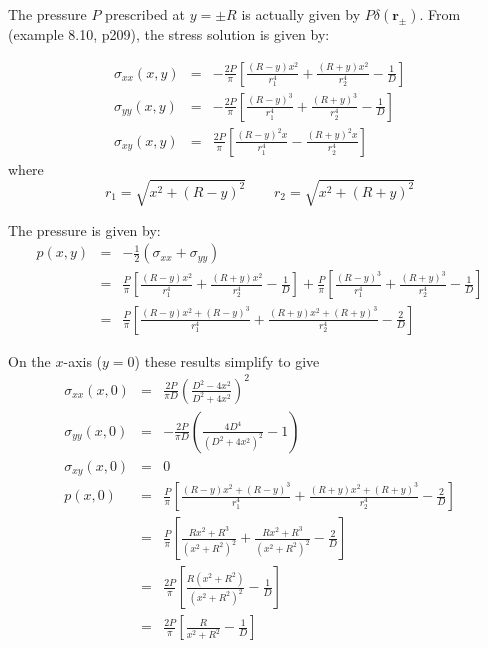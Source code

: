 The pressure $P$ prescribed at $y=\pm R$ is actually given by $P \delta({\bm r_\pm})$. 
From \cite{sadd14} (example 8.10, p209), the stress solution is given by:

\begin{eqnarray}
\sigma_{xx}(x,y)&=& -\frac{2P}{\pi}\left[\frac{(R-y)x^2}{r_1^4} + \frac{(R+y)x^2}{r_2^4} -\frac{1}{D} \right] \\
\sigma_{yy}(x,y)&=& -\frac{2P}{\pi}\left[\frac{(R-y)^3}{r_1^4} + \frac{(R+y)^3}{r_2^4} -\frac{1}{D} \right] \\
\sigma_{xy}(x,y)&=&  \frac{2P}{\pi}\left[\frac{(R-y)^2 x}{r_1^4} - \frac{(R+y)^2x}{r_2^4}  \right]
\end{eqnarray}
where 
\[
r_1=\sqrt{x^2 + (R-y)^2}
\quad\quad
r_2=\sqrt{x^2 + (R+y)^2}
\]

The pressure is given by:
\begin{eqnarray}
p(x,y) 
&=& -\frac{1}{2}(\sigma_{xx} + \sigma_{yy}) \nonumber\\
&=& 
 \frac{P}{\pi} \left[ \frac{(R-y)x^2}{r_1^4} + \frac{(R+y)x^2}{r_2^4} -\frac{1}{D} \right] 
+ \frac{P}{\pi} \left[ \frac{(R-y)^3}{r_1^4} + \frac{(R+y)^3}{r_2^4} -\frac{1}{D} \right] \\
&=& 
\frac{P}{\pi} \left[ \frac{(R-y)x^2 + (R-y)^3 }{r_1^4} + \frac{(R+y)x^2 + (R+y)^3}{r_2^4} - \frac{2}{D}\right] 
\end{eqnarray}

On the $x$-axis ($y=0$) these results simplify to give
\begin{eqnarray}
\sigma_{xx}(x,0) &=& \frac{2P}{\pi D} \left( \frac{D^2-4x^2}{D^2+4x^2}  \right)^2 \\
\sigma_{yy}(x,0) &=& -\frac{2P}{\pi D} \left( \frac{4D^4}{(D^2+4x^2)^2} -1 \right) \\
\sigma_{xy}(x,0) &=& 0 \\
p(x,0) 
&=& \frac{P}{\pi} \left[ \frac{(R-y)x^2 + (R-y)^3 }{r_1^4} + \frac{(R+y)x^2 + (R+y)^3  }{r_2^4}  - \frac{2}{D} \right] \\
&=& \frac{P}{\pi} \left[ \frac{Rx^2 + R^3 }{(x^2+R^2)^2} + \frac{Rx^2 + R^3  }{(x^2+R^2)^2}  - \frac{2}{D} \right] \\
&=& \frac{2P}{\pi} \left[ \frac{R(x^2 + R^2 )}{(x^2+R^2)^2} - \frac{1}{D} \right] \\
&=& \frac{2P}{\pi} \left[ \frac{R }{x^2+R^2} - \frac{1}{D} \right] \\
\end{eqnarray}


